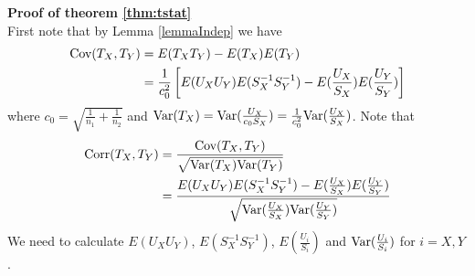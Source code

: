 	\textbf{Proof of theorem \ref{thm:tstat}} \\
	First note that by Lemma  \ref{lemmaIndep} we have
	\begin{align*}
	\text{Cov}(T_X, T_Y) &= E(T_XT_Y) - E(T_X)E(T_Y) \\
	& = \frac{1}{c_0^2} \left[E(U_XU_Y)E(S_X^{-1}S_Y^{-1}) - E(\frac{U_X}{S_X})E( 
	\frac{U_Y}{S_Y})\right]   
	\end{align*}
	where $c_0 = \sqrt{\frac{1}{n_1} + \frac{1}{n_2}}$ and $\text{Var}(T_X) = \text{Var}(\frac{U_X}{c_0S_X})=
	\frac{1}{c_0^2}\text{Var}(\frac{U_X}{S_X})$. 
	Note that 
	\begin{equation}\label{eq:Tcorrelation}
	\begin{aligned}
	\text{Corr}(T_X, T_Y) & = \frac{\text{Cov}(T_X, T_Y) }{\sqrt{\text{Var}(T_X) \text{Var}(T_Y) }} \\
	& = \frac{E(U_XU_Y)E(S_X^{-1}S_Y^{-1}) - E(\frac{U_X}{S_X})E(
		\frac{U_Y}{S_Y})}{\sqrt{\text{Var}(\frac{U_X}{S_X})\text{Var}(\frac{U_Y}{S_Y})}} 
	\end{aligned}
	\end{equation}
	We need to calculate $E(U_XU_Y)$, $E(S_X^{-1}S_Y^{-1})$, $ E(\frac{U_i}{S_i})$ and
	$\text{Var}(\frac{U_i}{S_i})$ for $i =X, Y$. 
